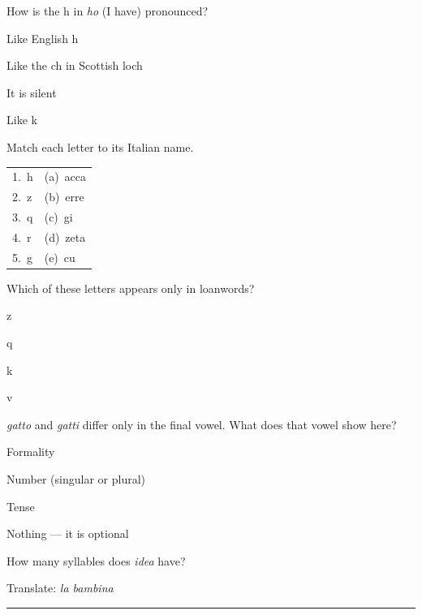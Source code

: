 \documentclass[11pt,a4paper,twoside,openright]{book}
\newcommand{\answerline}{\par\vspace{6pt}\noindent\rule{0.75\linewidth}{0.4pt}\par}
\begin{document}
\begin{exercises}
\item\label{ex:alphabet-vowels-1}\relax How is the h in \textit{ho} (I have) pronounced?\par\nopagebreak\begin{options}
\item\relax Like English h
\item\relax Like the ch in Scottish loch
\item\relax It is silent
\item\relax Like k
\end{options}
\item\label{ex:alphabet-vowels-2}\relax Match each letter to its Italian name.\par\smallskip\begin{tabularx}{\linewidth}{@{}L L@{}}
1.\ h & (a)\ acca \\
2.\ z & (b)\ erre \\
3.\ q & (c)\ gi \\
4.\ r & (d)\ zeta \\
5.\ g & (e)\ cu \\
\end{tabularx}
\item\label{ex:alphabet-vowels-3}\relax Which of these letters appears only in loanwords?\par\nopagebreak\begin{options}
\item\relax z
\item\relax q
\item\relax k
\item\relax v
\end{options}
\item\label{ex:alphabet-vowels-4}\relax \textit{gatto} and \textit{gatti} differ only in the final vowel. What does that vowel show here?\par\nopagebreak\begin{options}
\item\relax Formality
\item\relax Number (singular or plural)
\item\relax Tense
\item\relax Nothing — it is optional
\end{options}
\item\label{ex:alphabet-vowels-5}\relax How many syllables does \textit{idea} have?\par\nopagebreak\begin{options}
\item{}
\item{}
\item{}
\item{}
\end{options}
\item\label{ex:alphabet-vowels-6}\relax Translate: \textit{la bambina}\par\answerline
\end{exercises}
\end{document}
